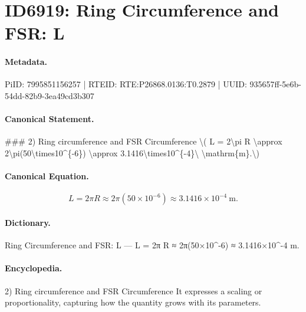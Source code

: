 \section*{ID6919: Ring Circumference and FSR: L}
\paragraph{Metadata.}
PiID: 7995851156257 | RTEID: RTE:P26868.0136:T0.2879 | UUID: 935657ff-5e6b-54dd-82b9-3ea49cd3b307

\paragraph{Canonical Statement.}
\#\#\# 2) Ring circumference and FSR Circumference \textbackslash{}( L = 2\textbackslash{}pi R \textbackslash{}approx 2\textbackslash{}pi(50\textbackslash{}times10\textasciicircum{}\{-6\}) \textbackslash{}approx 3.1416\textbackslash{}times10\textasciicircum{}\{-4\}\textbackslash{} \textbackslash{}mathrm\{m\}.\textbackslash{})

\paragraph{Canonical Equation.}
\[
L = 2\pi R \approx 2\pi(50\times10^{-6}) \approx 3.1416\times10^{-4}\ \mathrm{m}.
\]

\paragraph{Dictionary.}
Ring Circumference and FSR: L — L = 2π R ≈ 2π(50×10\textasciicircum{}-6) ≈ 3.1416×10\textasciicircum{}-4 m.

\paragraph{Encyclopedia.}
2) Ring circumference and FSR Circumference It expresses a scaling or proportionality, capturing how the quantity grows with its parameters.
